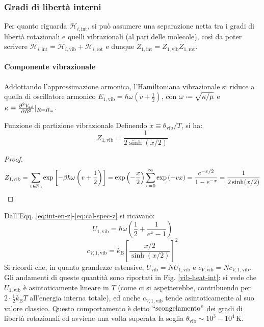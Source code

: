 \subsubsection{Gradi di libertà interni}

Per quanto riguarda $ \mathcal{H}_{i,\text{int}} $, si può assumere una separazione netta tra i gradi di libertà rotazionali e quelli vibrazionali (al pari delle molecole), così da poter scrivere $ \mathcal{H}_{i,\text{int}} = \mathcal{H}_{i,\text{vib}} + \mathcal{H}_{i,\text{rot}} $ e dunque $ Z_{1,\text{int}} = Z_{1,\text{vib}} Z_{1,\text{rot}} $.

\paragraph{Componente vibrazionale}

Addottando l'approssimazione armonica, l'Hamiltoniana vibrazionale si riduce a quella di oscillatore armonico $ E_{1,\text{vib}} = \hbar \omega \left( v + \frac{1}{2} \right) $, con $ \omega \defeq\sqrt{\kappa / \mu} $ e $ \kappa \equiv \frac{\partial^2 V_\text{ad}}{\partial R^2}\vert_{R = R_\text{m}} $.

\begin{proposition}{Funzione di partizione vibrazionale}{}
	Definendo $ x \equiv \theta_\text{vib} / T $, si ha:
	\begin{equation}
		Z_{1,\text{vib}} = \frac{1}{2 \sinh(x/2)}
	\end{equation}

	\tcblower

	\begin{proof}
		\begin{equation*}
			Z_{1,\text{vib}} = \sum_{v \in \mathbb{N}_0} \exp \left[ -\beta \hbar \omega \left( v + \frac{1}{2} \right) \right] = \exp \left( - \frac{x}{2} \right) \sum_{v = 0}^\infty \exp \left( -v x \right) = \frac{e^{-x/2}}{1 - e^{-x}} = \frac{1}{2 \sinh(x/2)}
		\end{equation*}
	\end{proof}
\end{proposition}

Dall'Eqq. \ref{eq:int-en-z}-\ref{eq:cal-spec-z} si ricavano:
\begin{equation}
	U_{1,\text{vib}} = \hbar \omega \left( \frac{1}{2} + \frac{1}{e^x - 1} \right)
\end{equation}
\begin{equation}
	c_{V,1,\text{vib}} = k_\text{B} \left[ \frac{x/2}{\sinh(x/2)} \right]^2
\end{equation}
Si ricordi che, in quanto grandezze estensive, $ U_\text{vib} = N U_{1,\text{vib}} $ e $ c_{V,\text{vib}} = N c_{V,1,\text{vib}} $. Gli andamenti di queste quantità sono riportati in Fig. \ref{vib-heat-int}: si vede che $ U_{1,\text{vib}} $ è asintoticamente lineare in $ T $ (come ci si aspetterebbe, contribuendo per $ 2 \cdot \frac{1}{2} k_\text{B} T $ all'energia interna totale), ed anche $ c_{V,1,\text{vib}} $ tende asintoticamente al suo valore classico. Questo comportamento è detto $ ``\text{scongelamento}" $ dei gradi di libertà rotazionali ed avviene una volta superata la soglia $ \theta_\text{vib} \sim 10^3-10^4 \,\text{K} $.

